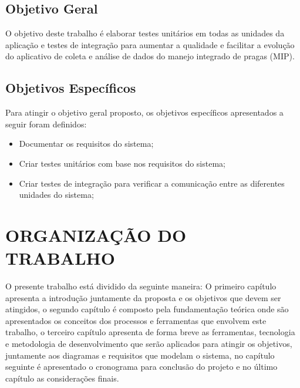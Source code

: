 \subsection{Objetivo Geral}

O objetivo deste trabalho é elaborar testes unitários em todas as unidades da aplicação e testes de integração para aumentar a qualidade e facilitar a evolução do aplicativo de coleta e análise de dados do manejo integrado de pragas (MIP). 


\subsection{Objetivos Específicos}

Para atingir o objetivo geral proposto, os objetivos específicos
apresentados a seguir foram definidos:



\begin{itemize}
\item Documentar os requisitos do sistema; 
 
\item Criar testes unitários com base nos requisitos do sistema;

\item Criar testes de integração para verificar a comunicação entre as diferentes unidades do sistema;


\end{itemize}

\section{ORGANIZAÇÃO DO TRABALHO}

O presente trabalho está dividido da seguinte maneira: O primeiro capítulo apresenta a introdução juntamente da proposta e os objetivos que devem ser atingidos, o segundo capítulo é composto pela fundamentação teórica onde são apresentados os conceitos dos processos e ferramentas que envolvem este trabalho, o terceiro capítulo apresenta de forma breve as ferramentas, tecnologia e metodologia de desenvolvimento que serão aplicados para atingir os objetivos, juntamente aos diagramas e requisitos que modelam o sistema, no capítulo seguinte é apresentado o cronograma para conclusão do projeto e no último capítulo as considerações finais.   
